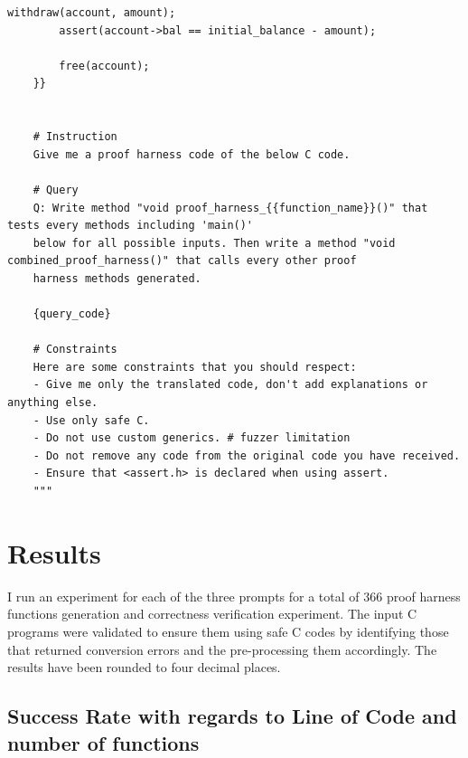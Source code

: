 \documentclass[onecolumn]{NobArticle}
\begin{document}
\begin{lstlisting}[caption=Generated Proof Harness Function]
        withdraw(account, amount);
        assert(account->bal == initial_balance - amount);
    
        free(account);
    }}
    

    # Instruction
    Give me a proof harness code of the below C code.

    # Query
    Q: Write method "void proof_harness_{{function_name}}()" that tests every methods including 'main()' 
    below for all possible inputs. Then write a method "void combined_proof_harness()" that calls every other proof 
    harness methods generated.
    
    {query_code}

    # Constraints
    Here are some constraints that you should respect:
    - Give me only the translated code, don't add explanations or anything else. 
    - Use only safe C.
    - Do not use custom generics. # fuzzer limitation
    - Do not remove any code from the original code you have received.
    - Ensure that <assert.h> is declared when using assert. 
    """ 
\end{lstlisting}


\section{Results}
\quad I run an experiment for each of the three prompts for a total of 366 proof harness functions generation and correctness verification experiment. The input C programs were validated to ensure them using safe C codes by identifying those that returned conversion errors and the pre-processing them accordingly.  The results have been rounded to four decimal places. 


\subsection{Success Rate with regards to Line of Code and number of functions}
\end{document}
